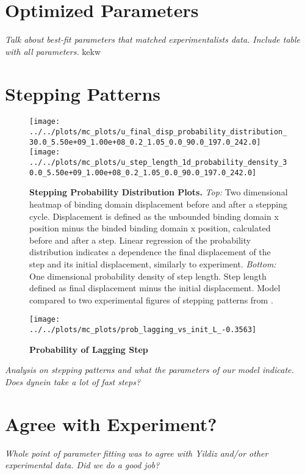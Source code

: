 \section{Optimized Parameters}
\textit{Talk about best-fit parameters that matched experimentalists data. Include table with all parameters.}
kekw
\section{Stepping Patterns}
\begin{figure}[H]
	\centering
	\texttt{[image: ../../plots/mc\_plots/u\_final\_disp\_probability\_distribution\_30.0\_5.50e+09\_1.00e+08\_0.2\_1.05\_0.0\_90.0\_197.0\_242.0]}
	\texttt{[image: ../../plots/mc\_plots/u\_step\_length\_1d\_probability\_density\_30.0\_5.50e+09\_1.00e+08\_0.2\_1.05\_0.0\_90.0\_197.0\_242.0]}
	\caption[Final Displacement Probability Distribution]{\textbf{Stepping Probability Distribution Plots.} \textit{Top:} Two dimensional heatmap of binding domain displacement before and after a stepping cycle. Displacement is defined as the unbounded binding domain x position minus the binded binding domain x position, calculated before and after a step. Linear regression of the probability distribution indicates a dependence the final displacement of the step and its initial displacement, similarly to experiment. \textit{Bottom:} One dimensional probability density of step length. Step length defined as final displacement minus the initial displacement. Model compared to two experimental figures of stepping patterns from \citep{Dewitt2012}.} 
	\label{fig:final_disp}
\end{figure}


\begin{figure}[H]
	\centering
	\texttt{[image: ../../plots/mc\_plots/prob\_lagging\_vs\_init\_L\_-0.3563]}
	\caption[Probability of Lagging Step]{\textbf{Probability of Lagging Step}}
	\label{fig:step_length}
\end{figure}

\textit{Analysis on stepping patterns and what the parameters of our model indicate. Does dynein take a lot of fast steps?}

\section{Agree with Experiment?}
\textit{Whole point of parameter fitting was to agree with Yildiz and/or other experimental data. Did we do a good job?}